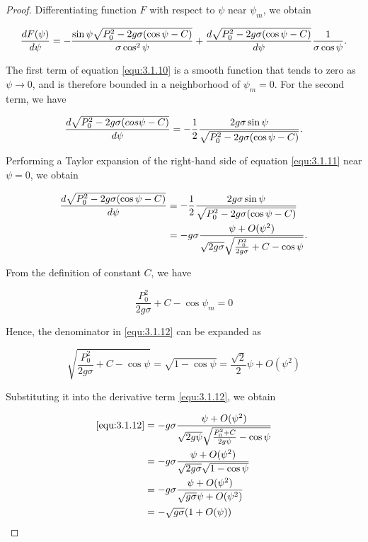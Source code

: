 \documentclass[10pt,a4paper]{amsart}
\begin{document}
\begin{proof}
    \noindent Differentiating function $F$ with respect to $\psi$ near $\psi_m$,  we obtain

    \begin{equation}{\label{equ:3.1.10}}
        \frac{dF(\psi)}{d\psi}=-\frac{\sin\psi\sqrt{P_{0}^{2}-2g\sigma(\cos \psi-C)}}{\sigma \cos^{2}\psi}+\frac{d\sqrt{P_{0}^{2}-2g\sigma(\cos \psi-C)}}{d\psi}\frac{1}{\sigma \cos \psi}.
    \end{equation}

    \noindent  The first term of equation \eqref{equ:3.1.10} is a smooth function that tends to zero as $\psi\rightarrow 0$, and is therefore bounded in a neighborhood of $\psi_m=0$. For the second term, we have
    
    \begin{equation}{\label{equ:3.1.11}}
        \frac{d\sqrt{P_{0}^{2}-2g\sigma(cos \psi-C)}}{d\psi}=-\frac{1}{2}\frac{2g\sigma \sin\psi}{\sqrt{P_{0}^{2}-2g\sigma(\cos \psi-C)}}.
    \end{equation}

     \noindent Performing a Taylor expansion of the right-hand side of equation \eqref{equ:3.1.11} near $\psi=0$, we obtain

    \begin{align}
        \frac{d\sqrt{P_{0}^{2}-2g\sigma(\cos \psi-C)}}{d\psi}&=-\frac{1}{2}\frac{2g\sigma \sin\psi}{\sqrt{P_{0}^{2}-2g\sigma(\cos \psi-C)}} \notag\\
        &=-g\sigma \frac{\psi+O(\psi^{2})}{\sqrt{2g\sigma}\sqrt{\frac{P_{0}^{2}}{2g\sigma}+C-\cos\psi}} \label{equ:3.1.12}.
    \end{align}

     From the definition of constant $C$, we have

    \begin{equation*}
        \frac{P_{0}^{2}}{2g\sigma}+C-\cos\psi_m=0
    \end{equation*}

    \noindent Hence, the denominator in \eqref{equ:3.1.12} can be expanded as

    \begin{equation*}
        \sqrt{\frac{P_{0}^{2}}{2g\sigma}+C-\cos\psi}=\sqrt{1-\cos\psi}=\frac{\sqrt{2}}{2}\psi+O(\psi^{2})
    \end{equation*}
    
    \noindent  Substituting it into the derivative term \eqref{equ:3.1.12}, we obtain

    \begin{align}
         \eqref{equ:3.1.12}&=-g\sigma \frac{\psi+O(\psi^{2})}{\sqrt{2g\psi}\sqrt{\frac{P_{0}^{2}+C}{2g\psi}-\cos\psi}} \notag\\
         &= -g\sigma \frac{\psi+O(\psi^{2})}{\sqrt{2g\sigma}\sqrt{1-\cos\psi}} \notag\\
         &=-g\sigma \frac{\psi+O(\psi^{2})}{\sqrt{g\sigma}\psi+O(\psi^{2})} \notag\\
          &=-\sqrt{g\sigma} (1+O(\psi)) \label{equ:3.1.13}
    \end{align}
    

\end{proof}
\end{document}

